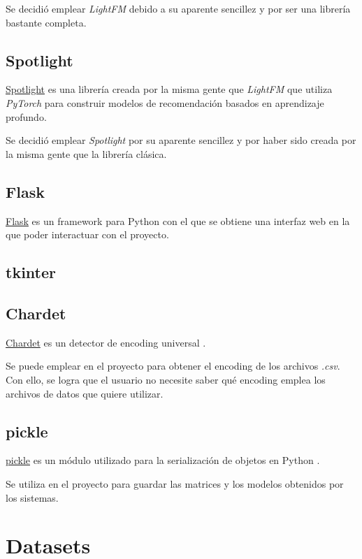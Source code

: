 Se decidió emplear \textit{LightFM} debido a su aparente sencillez y por ser una librería bastante completa.

\subsection{Spotlight}\label{spotlight}
\href{https://github.com/maciejkula/spotlight}{Spotlight} es una librería creada por la misma gente que \textit{LightFM} que utiliza \textit{PyTorch} para construir modelos de recomendación \cite{kula2017spotlight} basados en aprendizaje profundo.

Se decidió emplear \textit{Spotlight} por su aparente sencillez y por haber sido creada por la misma gente que la librería clásica.

\subsection{Flask}\label{flask}
\href{http://flask.pocoo.org/}{Flask} es un framework para Python con el que se obtiene una interfaz web en la que poder interactuar con el proyecto.

\subsection{tkinter}\label{tkinter}


\subsection{Chardet}\label{chardet}
\href{https://pypi.org/project/chardet/}{Chardet} es un detector de encoding universal \cite{chardet}.

Se puede emplear en el proyecto para obtener el encoding de los archivos \textit{.csv}. Con ello, se logra que el usuario no necesite saber qué encoding emplea los archivos de datos que quiere utilizar.

\subsection{pickle}\label{pickle}
\href{https://docs.python.org/3/library/pickle.html}{pickle} es un módulo utilizado para la serialización de objetos en Python \cite{pickle}.

Se utiliza en el proyecto para guardar las matrices y los modelos obtenidos por los sistemas.

\section{Datasets}\label{datasets}
